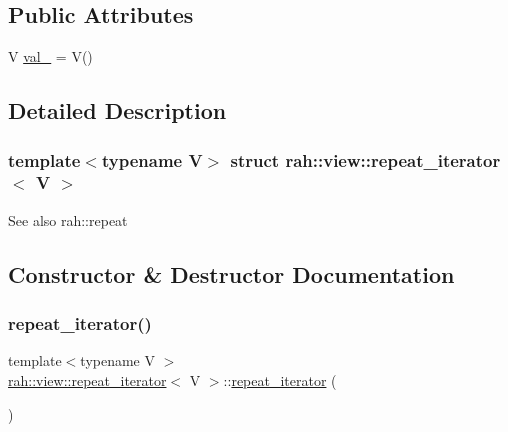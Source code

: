 \subsection*{Public Attributes}
\begin{DoxyCompactItemize}
\item 
V \mbox{\hyperlink{structrah_1_1view_1_1repeat__iterator_a6286ca38cb848630cb870dc6ab42eb79}{val\+\_\+}} = V()
\end{DoxyCompactItemize}


\subsection{Detailed Description}
\subsubsection*{template$<$typename V$>$\newline
struct rah\+::view\+::repeat\+\_\+iterator$<$ V $>$}

\begin{DoxySeeAlso}{See also}
rah\+::repeat 
\end{DoxySeeAlso}


\subsection{Constructor \& Destructor Documentation}
\mbox{\label{structrah_1_1view_1_1repeat__iterator_a627f63a3a1ecf8a5dbcc88fb47d4a494}} 
\subsubsection{\texorpdfstring{repeat\_iterator()}{repeat\_iterator()}\hspace{0.1cm}{\footnotesize\ttfamily [1/4]}}
{\footnotesize\ttfamily template$<$typename V $>$ \\
\mbox{\hyperlink{structrah_1_1view_1_1repeat__iterator}{rah\+::view\+::repeat\+\_\+iterator}}$<$ V $>$\+::\mbox{\hyperlink{structrah_1_1view_1_1repeat__iterator}{repeat\+\_\+iterator}} (\begin{DoxyParamCaption}{ }\end{DoxyParamCaption})\hspace{0.3cm}{\ttfamily [default]}}

